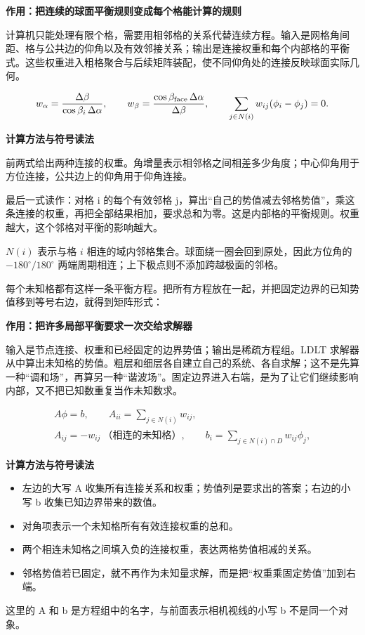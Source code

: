 \documentclass[12pt,a4paper]{article}
\numberwithin{equation}{topic}
\begin{document}
\noindent\textbf{作用：把连续的球面平衡规则变成每个格能计算的规则}\par\nobreak
计算机只能处理有限个格，需要用相邻格的关系代替连续方程。输入是网格角间距、格与公共边的仰角以及有效邻接关系；输出是连接权重和每个内部格的平衡式。这些权重进入粗格聚合与后续矩阵装配，使不同仰角处的连接反映球面实际几何。

\begin{equation}
\label{eq:flux}
w_\alpha=\frac{\Delta\beta}{\cos\beta_i\,\Delta\alpha},
\qquad
w_\beta=\frac{\cos\beta_{\rm face}\,\Delta\alpha}{\Delta\beta},
\qquad
\sum_{j\in N(i)}w_{ij}(\phi_i-\phi_j)=0.
\end{equation}

\noindent\textbf{计算方法与符号读法}\par\nobreak
前两式给出两种连接的权重。角增量表示相邻格之间相差多少角度；中心仰角用于方位连接，公共边上的仰角用于仰角连接。

最后一式读作：对格 i 的每个有效邻格 j，算出“自己的势值减去邻格势值”，乘这条连接的权重，再把全部结果相加，要求总和为零。这是内部格的平衡规则。权重越大，这个邻格对平衡的影响越大。


\(N(i)\) 表示与格 \(i\) 相连的域内邻格集合。球面绕一圈会回到原处，因此方位角的 \(-180^\circ/180^\circ\) 两端周期相连；上下极点则不添加跨越极面的邻格。

每个未知格都有这样一条平衡方程。把所有方程放在一起，并把固定边界的已知势值移到等号右边，就得到矩阵形式：

\noindent\textbf{作用：把许多局部平衡要求一次交给求解器}\par\nobreak
输入是节点连接、权重和已经固定的边界势值；输出是稀疏方程组。LDLT 求解器从中算出未知格的势值。粗层和细层各自建立自己的系统、各自求解；这不是先算一种“调和场”，再算另一种“谐波场”。固定边界进入右端，是为了让它们继续影响内部，又不把已知数重复当作未知数求。

\begin{equation}
\label{eq:matrix}
\begin{gathered}
A\phi=b,\qquad
A_{ii}=\sum_{j\in N(i)}w_{ij},\\
A_{ij}=-w_{ij}\ \text{（相连的未知格）},\qquad
b_i=\sum_{j\in N(i)\cap D}w_{ij}\phi_j,
\end{gathered}
\end{equation}

\noindent\textbf{计算方法与符号读法}\par\nobreak
\begin{itemize}
\item 左边的大写 A 收集所有连接关系和权重；势值列是要求出的答案；右边的小写 b 收集已知边界带来的数值。
\item 对角项表示一个未知格所有有效连接权重的总和。
\item 两个相连未知格之间填入负的连接权重，表达两格势值相减的关系。
\item 邻格势值若已固定，就不再作为未知量求解，而是把“权重乘固定势值”加到右端。
\end{itemize}
这里的 A 和 b 是方程组中的名字，与前面表示相机视线的小写 b 不是同一个对象。
\end{document}

